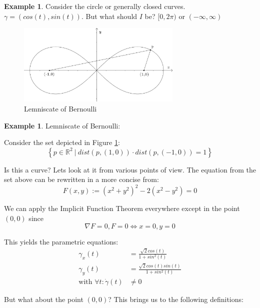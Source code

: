 \documentclass[a4paper,11pt,notitlepage,fullpage]{paper}
\theoremstyle{plain}
\theoremstyle{definition}
\newtheorem{exmp}[thm]{Example} %
\begin{document}
\begin{exmp}
Consider the circle or generally closed curves. $\gamma = (cos(t), sin(t))$. But what should $I$ be? $[0, 2\pi)$ or $(-\infty, \infty)$
\end{exmp}

\begin{figure}
\centering
\includegraphics[width = 0.7\textwidth]{img/lemniscate}
\caption{Lemniscate of Bernoulli}
\label{fig:lemniscate}
\end{figure}


\begin{exmp}
Lemniscate of Bernoulli:

Consider the set depicted in Figure \ref{fig:lemniscate}:
\begin{equation*}
\left\{p \in \mathbb R^2 ~|~ dist\left(p, \left(1,0\right)\right) \cdot dist\left(p, \left(-1,0\right)\right) = 1\right\}
\end{equation*}

Is this a curve? Lets look at it from various points of view. The equation from the set above can be rewritten in a more concise from: 
\begin{equation*}
F(x,y) := (x^2+y^2)^2 - 2(x^2-y^2) = 0
\end{equation*}

We can apply the Implicit Function Theorem everywhere except in the point $(0,0)$ since
\begin{equation*}
\nabla F = 0, F = 0 \Leftrightarrow x = 0, y = 0
\end{equation*}

This yields the parametric equations:
\begin{align*}
\gamma_x(t) &= \frac{\sqrt 2 cos(t)}{1+sin^2(t)} \\
\gamma_y(t) &= \frac{\sqrt 2 cos(t) sin(t)}{1+sin^2(t)} \\
\text{with }\forall t:\dot\gamma(t) &\neq 0 
\end{align*}

But what about the point $(0,0)$? This brings us to the following definitions:
\end{exmp}
\end{document}

